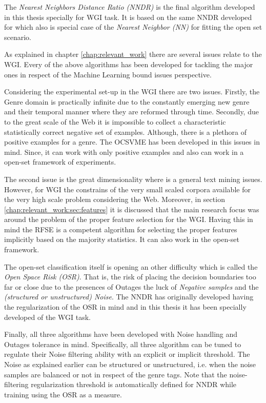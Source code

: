 The \textit{Nearest Neighbors Distance Ratio (NNDR)} is the final algorithm developed in this thesis specially for WGI task. It is based on the same NNDR developed for \parencite{} which also is special case of the \textit{Nearest Neighbor (NN)} for fitting the open set scenario. 

As explained in chapter \ref{chap:relevant_work} there are several issues relate to the WGI. Every of the above algorithms has been developed for tackling the major ones in respect of the Machine Learning bound issues perspective. 

Considering the experimental set-up in the WGI there are two issues. Firstly, the Genre domain is practically infinite due to the constantly emerging new genre and their temporal manner where they are reformed through time. Secondly, due to the great scale of the Web it is impossible to collect a characteristic statistically correct negative set of examples. Although, there is a plethora of positive examples for a genre. The OCSVME has been developed in this issues in mind. Since, it can work with only positive examples and also can work in a open-set framework of experiments.

The second issue is the great dimensionality where is a general text mining issues. However, for WGI the constrains of the very small scaled corpora available for the very high scale problem considering the Web. Moreover, in section \ref{chap:relevant_work:sec:features} it is discussed that the main research focus was around the problem of the proper feature selection for the WGI. Having this in mind the RFSE is a competent algorithm for selecting the proper features implicitly based on the majority statistics. It can also work in the open-set framework.

The open-set classification itself is opening an other difficulty which is called the \textit{Open Space Risk (OSR)}. That is, the risk of placing the decision boundaries too far or close due to the presences of Outages the luck of \textit{Negative samples} and the \textit{(structured or unstructured) Noise}. The NNDR has originally developed having the regularization of the OSR in mind and in this thesis it has been specially developed of the WGI task.

Finally, all three algorithms have been developed with Noise handling and Outages tolerance in mind. Specifically, all three algorithm can be tuned to regulate their Noise filtering ability with an explicit or implicit threshold. The Noise as explained earlier can be structured or unstructured, i.e. when the noise samples are balanced or not in respect of the genre tags. Note that the noise-filtering regularization threshold is automatically defined for NNDR while training using the OSR as a measure.


